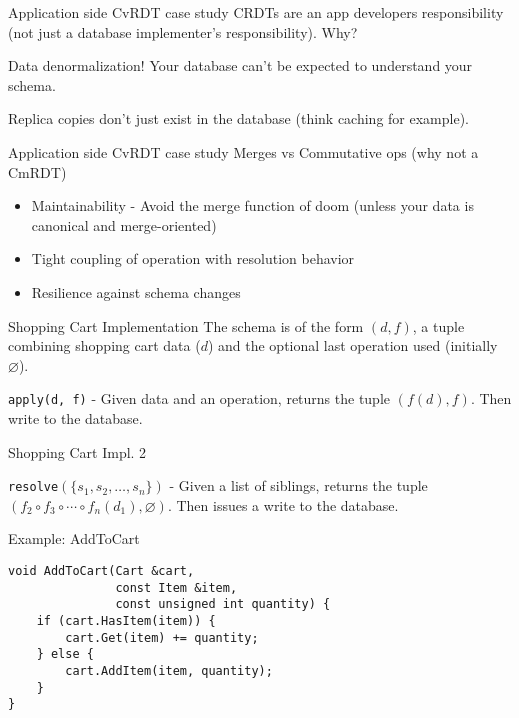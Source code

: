 \documentclass[17pt]{beamer}
\begin{document}
\begin{frame}{Application side CvRDT case study}
  CRDTs are an app developers responsibility (not just a database
  implementer's responsibility). Why?
  \pause

  Data denormalization!
  \pause
  Your database can't be expected to understand your schema.
  \pause

  Replica copies don't just exist in the database (think caching for example).
\end{frame}
\begin{frame}{Application side CvRDT case study}
  Merges vs Commutative ops (why not a CmRDT)
  \pause

  \begin{itemize}
    \item Maintainability - Avoid the merge function of doom (unless
      your data is canonical and merge-oriented)
      \pause
    \item Tight coupling of operation with resolution behavior
      \pause
    \item Resilience against schema changes
  \end{itemize}
\end{frame}
\begin{frame}{Shopping Cart Implementation}
  The schema is of the form $(d, f)$, a tuple combining shopping cart
  data ($d$) and the optional last operation used (initially $\varnothing$).
  \pause
  \begin{definition}
    \texttt{apply(d, f)} - Given data and an operation, returns the
    tuple $(f(d), f)$. Then write to the database.
  \end{definition}
\end{frame}
\begin{frame}{Shopping Cart Impl. 2}
  \begin{definition}
    \texttt{resolve$\left(\{s_1, s_2, \dots, s_n\}\right)$} - Given a
    list of siblings, returns the tuple $(f_2\circ f_3 \circ\cdots\circ f_n(d_1), \varnothing)$.
    Then issues a write to the database.
  \end{definition}
\end{frame}
\begin{frame}[fragile]{Example: AddToCart}
  \small
\begin{verbatim}
void AddToCart(Cart &cart,
               const Item &item,
               const unsigned int quantity) {
    if (cart.HasItem(item)) {
        cart.Get(item) += quantity;
    } else {
        cart.AddItem(item, quantity);
    }
}
\end{verbatim}
\end{frame}
\end{document}
